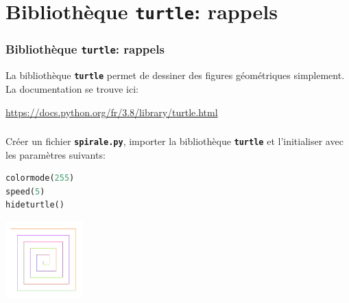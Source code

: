 \documentclass[svgnames,11pt]{beamer}
\begin{document}
\section{Bibliothèque \textbf{\texttt{turtle}}: rappels}
\begin{frame}
    \frametitle{Bibliothèque \textbf{\texttt{turtle}}: rappels}

    La bibliothèque \textbf{\texttt{turtle}} permet de dessiner des figures géométriques simplement. La documentation se trouve ici:
\begin{center}
\url{https://docs.python.org/fr/3.8/library/turtle.html}
\end{center}
\end{frame}
\begin{frame}[fragile]
    \frametitle{}

    \begin{activite}
 Créer un fichier \textbf{\texttt{spirale.py}}, importer la bibliothèque \textbf{\texttt{turtle}} et l'initialiser avec les paramètres suivants:
\begin{center}
\begin{lstlisting}[language=Python , basicstyle=\ttfamily\small, xleftmargin=2em, xrightmargin=2em]
colormode(255)
speed(5)
hideturtle()
\end{lstlisting}
\end{center}

    \end{activite}
\begin{center}
\centering
\includegraphics[width=3cm]{ressources/spirale.png}
\end{center}
\end{frame}
\end{document}
